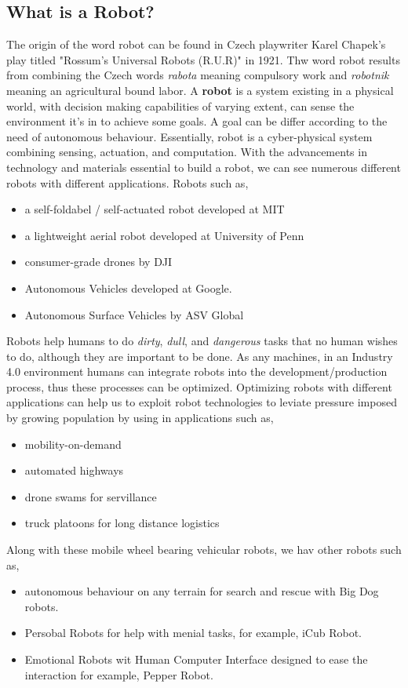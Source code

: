 \subsection{What is a Robot?}
The origin of the word robot can be found in Czech playwriter Karel Chapek's play titled "Rossum's
Universal Robots (R.U.R)" in 1921. Thw word robot results from combining the Czech words \textit{rabota} meaning 
compulsory work and \textit{robotnik} meaning an agricultural bound labor. A \textbf{robot} is a system existing 
in a physical world, with decision making capabilities of varying extent, can sense the environment it's in to achieve
some goals. A goal can be differ according to the need of autonomous behaviour. Essentially, robot is a cyber-physical system 
combining sensing, actuation, and computation. With the advancements in technology and materials essential to build a robot, we can
see numerous different robots with different applications. Robots such as,
\begin{itemize}
    \item a self-foldabel / self-actuated robot developed at MIT \cite{Sung2016ComputationalDO}
    \item a lightweight aerial robot developed at University of Penn
    \item consumer-grade drones by DJI 
    \item Autonomous Vehicles developed at Google.
    \item Autonomous Surface Vehicles by ASV Global
\end{itemize}
Robots help humans to do \textit{dirty}, \textit{dull}, and \textit{dangerous} tasks that no human wishes to do, although they are
important to be done. As any machines, in an Industry 4.0 environment humans can integrate robots into the development/production process,
thus these processes can be optimized. Optimizing robots with different applications can help us to exploit robot technologies to leviate pressure
imposed by growing population by using in applications such as, \begin{itemize}
    \item  mobility-on-demand
    \item  automated highways
    \item  drone swams for servillance
    \item  truck platoons for long distance logistics
\end{itemize} Along with these mobile wheel bearing vehicular robots, we hav other robots such as,
\begin{itemize}
    \item autonomous behaviour on any terrain for search and rescue with Big Dog robots.
    \item Persobal Robots for help with menial tasks, for example, iCub Robot.
    \item Emotional Robots wit Human Computer Interface designed to ease the interaction for example, Pepper Robot.
\end{itemize}

